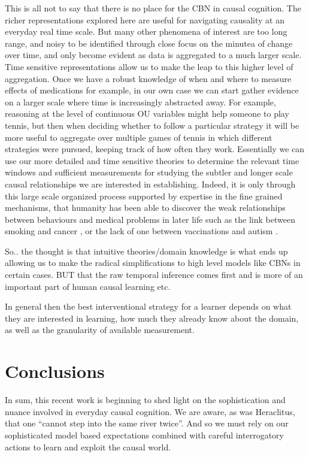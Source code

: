 \documentclass{cambridge7A}%
\begin{document}
This is all not to say that there is no place for the CBN in causal cognition.  %
The richer representations explored here are useful for navigating causality at an everyday real time scale.  But many other phenomena of interest are too long range, and noisy to be identified through close focus on the minutea of change over time, and only become evident as data is aggregated to a much larger scale.  Time sensitive representations allow us to make the leap to this higher level of aggregation.  Once we have a robust knowledge of when and where to measure effects of medications for example, in our own case we can start gather evidence on a larger scale where time is increasingly abstracted away.  For example, reasoning at the level of continuous OU variables might help someone to play tennis, but then when deciding whether to follow a particular strategy it will be more useful to aggregate over multiple games of tennis in which different strategies were pursued, keeping track of how often they work.  Essentially we can use our more detailed and time sensitive theories to determine the relevant time windows and sufficient measurements for studying the subtler and longer scale causal relationships we are interested in establishing.  Indeed, it is only through this large scale organized process supported by expertise in the fine grained mechanisms, that humanity has been able to discover the weak relationships between behaviours and medical problems in later life such as the link between smoking and cancer \citep{gandini2008tobacco}, or the lack of one between vaccinations and autism \citep{verschuur1996hidden}.

So.. the thought is that intuitive theories/domain knowledge is what ends up allowing us to make the radical simplifications to high level models like CBNs in certain cases.  BUT that the raw temporal inference comes first and is more of an important part of human causal learning etc.

In general then the best interventional strategy for a learner depends on what they are interested in learning, how much they already know about the domain, as well as the granularity of available measurement.


\section{Conclusions}

In sum, this recent work is beginning to shed light on the sophistication and nuance involved in everyday causal cognition.  We are aware, as was Heraclitus, that one ``cannot step into the same river twice''\citep{barnes2013presocratics}.  And so we must rely on our sophisticated model based expectations combined with careful interrogatory actions to learn and exploit the causal world.

\clearpage


\end{document}
